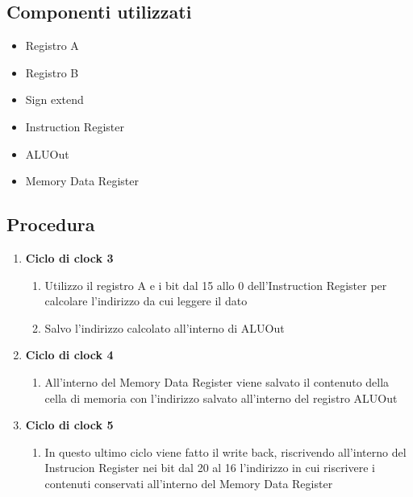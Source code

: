 \subsection{Componenti utilizzati}
\begin{itemize}
    \item Registro A
    \item Registro B
    \item Sign extend
    \item Instruction Register
    \item ALUOut
    \item Memory Data Register
\end{itemize}

\subsection{Procedura}
\begin{enumerate}
    \item[3.] \textbf{Ciclo di clock 3}
        \begin{enumerate}[label=\theenumi.\arabic*]
            \item [3.1] Utilizzo il registro A e i bit dal 15 allo 0 dell'Instruction Register per calcolare l'indirizzo da cui leggere il dato
            \item [3.2] Salvo l'indirizzo calcolato all'interno di ALUOut
        \end{enumerate}
    \item [4.] \textbf{Ciclo di clock 4}
        \begin{enumerate} [label=\theenumi.\arabic*]
            \item [4.1] All'interno del Memory Data Register viene salvato il contenuto della cella di memoria con l'indirizzo salvato all'interno del registro ALUOut
        \end{enumerate}
    \item [5.] \textbf{Ciclo di clock 5}
        \begin{enumerate} [label=\theenumi.\arabic*]
            \item [5.1] In questo ultimo ciclo viene fatto il write back, riscrivendo all'interno del Instrucion Register nei bit dal 20 al 16 l'indirizzo in cui riscrivere i contenuti conservati all'interno del Memory Data Register
        \end{enumerate}
\end{enumerate}

